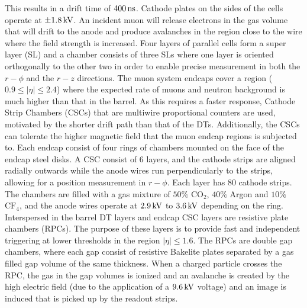 This results in a drift time of $400\,\text{ns}$. Cathode plates on the sides of the cells operate at $\pm1.8\,\text{k\hspace{-.08em}V}$. 
An incident muon will release electrons in the gas volume that will drift to the anode and produce avalanches in the region close to the wire where the field strength is increased.
Four layers of parallel cells form a super layer (SL) and a chamber consists of three SLs where one layer is oriented orthogonally to the other two in order to enable precise measurement in both the $r-\phi$ and the $r-z$ directions.
\newpara
\noindent\justify
The muon system endcaps cover a region ($0.9\leq|\eta|\leq2.4$) where the expected rate of muons and neutron background is much higher than that in the barrel. 
As this requires a faster response, Cathode Strip Chambers (CSCs) that are multiwire proportional counters are used, motivated by the shorter drift path than that of the DTs. 
Additionally, the CSCs can tolerate the higher magnetic field that the muon endcap regions is subjected to. 
Each endcap consist of four rings of chambers mounted on the face of the endcap steel disks. 
A CSC consist of 6 layers, and the cathode strips are aligned radially outwards while the anode wires run perpendicularly to the strips, allowing for a position measurement in $r-\phi$. 
Each layer has 80 cathode strips. 
The chambers are filled with a gas mixture of $50\%$ $\mathrm{CO_{2}}$, $40\%$ Argon and $10\%$ $\mathrm{CF_{4}}$, and the anode wires operate at $2.9\,\text{k\hspace{-.08em}V}$ to $3.6\,\text{k\hspace{-.08em}V}$ depending on the ring. 
Interspersed in the barrel DT layers and endcap CSC layers are resistive plate chambers (RPCs). 
The purpose of these layers is to provide fast and independent triggering at lower \pt thresholds in the region $|\eta|\leq1.6$. 
The RPCs are double gap chambers, where each gap consist of resistive Bakelite plates separated by a gas filled gap volume of the same thickness. 
When a charged particle crosses the RPC, the gas in the gap volumes is ionized and an avalanche is created by the high electric field (due to the application of a $9.6\,\text{k\hspace{-.08em}V}$ voltage) and an image is induced that is picked up by the readout strips. 
